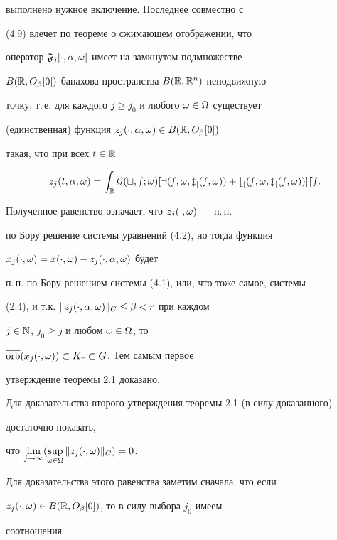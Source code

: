 выполнено нужное включение. Последнее совместно с


(4.9) влечет по теореме о сжимающем отображении, что


оператор $\frak F_{j}[\cdot,\alpha,\omega]$ имеет на замкнутом подмножестве


$B(\Bbb R,O_{\beta}[0])$ банахова пространства $B(\Bbb R,\Bbb R^{n})$ неподвижную


точку, т.\,е. для каждого $j\ge j_{0}$ и любого $\omega\in\Omega$ существует


(единственная) функция $z_{j}(\cdot,\alpha,\omega)\in B(\Bbb R,O_{\beta}[0])$


такая, что при всех $t\in\Bbb R$


\begin{equation}


z_{j}(t,\alpha,\om)=\int_{\R}\cal G(t,s;\omega)[a(s,\om,z_{j}(s,\om))


+b_{j}(s,\om,z_{j}(s,\om))]ds.


\end{equation}


Полученное равенство означает, что $z_{j}(\cdot,\omega)$ --- п.\,п.


по Бору решение системы уравнений (4.2), но тогда функция


$x_{j}(\cdot,\omega)=x(\cdot,\omega)-z_{j}(\cdot,\alpha,\omega)$ будет


п.\,п. по Бору решением системы (4.1), или, что тоже самое, системы


(2.4), и т.к. $\|z_{j}(\cdot,\alpha,\omega)\|_{C}\le\beta<r$ при каждом


$j\in\Bbb N$, $j_{0}\ge j$ и любом $\omega\in\Omega$, то


$\overline{\operatorname{orb}}(x_{j}(\cdot,\omega))\subset K_{r}\subset G$. Тем самым первое


утверждение теоремы 2.1 доказано.





Для доказательства второго утверждения теоремы 2.1 (в силу доказанного)


достаточно показать,


что $\lim\limits_{j\to\infty}(\sup\limits_{\omega\in\Omega}\|z_{j}(\cdot,\omega)\|_{C})=0$.


Для доказательства этого равенства заметим сначала, что если


$z_{j}(\cdot,\omega)\in B(\Bbb R,O_{\beta}[0])$, то в силу выбора $j_{0}$ имеем


соотношения


